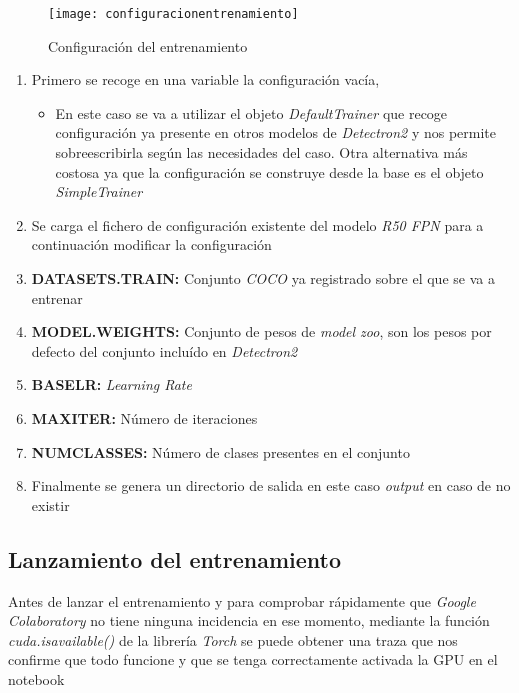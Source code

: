 \begin{figure}[htb]
\centering
\texttt{[image: configuracionentrenamiento]}
\caption[Configuración del entrenamiento]{Configuración del entrenamiento}
\end{figure}
    
\begin{enumerate}
    \item Primero se recoge en una variable la configuración vacía,
    \begin{itemize}
        \item En este caso se va a utilizar el objeto \emph{DefaultTrainer} que recoge configuración ya presente en otros modelos de \emph{Detectron2} y nos permite sobreescribirla según las necesidades del caso. Otra alternativa más costosa ya que la configuración se construye desde la base es el objeto \emph{SimpleTrainer}\cite{DT2:Training}
    \end{itemize}
    \item Se carga el fichero de configuración existente del modelo \emph{R50 FPN} para a continuación modificar la configuración
    \item \textbf{DATASETS.TRAIN:} Conjunto \emph{COCO} ya registrado sobre el que se va a entrenar
    \item \textbf{MODEL.WEIGHTS:} Conjunto de pesos de \emph{model zoo}, son los pesos por defecto del conjunto incluído en \emph{Detectron2}
    \item \textbf{BASE\textunderscore LR:} \emph{Learning Rate}
    \item \textbf{MAX\textunderscore ITER:} Número de iteraciones
    \item \textbf{NUM\textunderscore CLASSES:} Número de clases presentes en el conjunto
    \item Finalmente se genera un directorio de salida en este caso \emph{output} en caso de no existir
\end{enumerate}

\subsection{Lanzamiento del entrenamiento}

Antes de lanzar el entrenamiento y para comprobar rápidamente que \emph{Google Colaboratory} no tiene ninguna incidencia en ese momento, mediante la función \emph{cuda.is\textunderscore available()} de la librería \emph{Torch} se puede obtener una traza que nos confirme que todo funcione y que se tenga correctamente activada la GPU en el notebook

